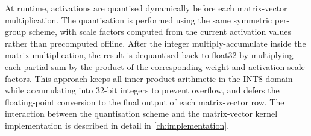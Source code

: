 At runtime, activations are quantised dynamically before each matrix-vector
multiplication. The quantisation is performed using the same symmetric
per-group scheme, with scale factors computed from the current activation
values rather than precomputed offline. After the integer multiply-accumulate
inside the matrix multiplication, the result is dequantised back to float32
by multiplying each partial sum by the product of the corresponding weight
and activation scale factors. This approach keeps all inner product arithmetic
in the INT8 domain while accumulating into 32-bit integers to prevent
overflow, and defers the floating-point conversion to the final output of
each matrix-vector row. The interaction between the quantisation scheme and
the matrix-vector kernel implementation is described in detail in
\cref{ch:implementation}.
